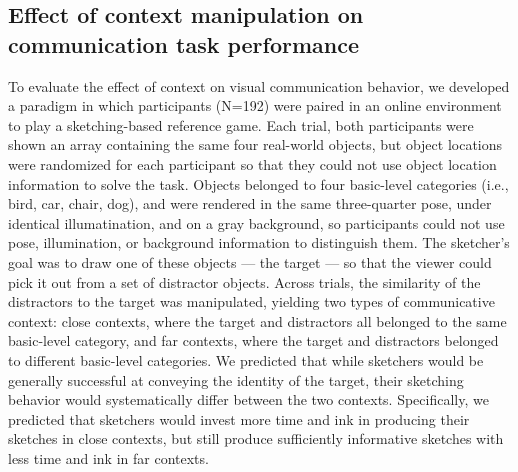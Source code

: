 \documentclass[9pt,twocolumn,twoside]{pnas-new}
\begin{document}
\subsection*{Effect of context manipulation on communication task performance}



To evaluate the effect of context on visual communication behavior, we developed a paradigm in which participants (N=192) were paired in an online environment to play a sketching-based reference game. Each trial, both participants were shown an array containing the same four real-world objects, but object locations were randomized for each participant so that they could not use object location information to solve the task. Objects belonged to four basic-level categories (i.e., bird, car, chair, dog), and were rendered in the same three-quarter pose, under identical illumatination, and on a gray background, so participants could not use pose, illumination, or background information to distinguish them. 
The sketcher's goal was to draw one of these objects --- the target --- so that the viewer could pick it out from a set of distractor objects. 
Across trials, the similarity of the distractors to the target was manipulated, yielding two types of communicative context: close contexts, where the target and distractors all belonged to the same basic-level category, and far contexts, where the target and distractors belonged to different basic-level categories. 
We predicted that while sketchers would be generally successful at conveying the identity of the target, their sketching behavior would systematically differ between the two contexts. 
Specifically, we predicted that sketchers would invest more time and ink in producing their sketches in close contexts, but still produce sufficiently informative sketches with less time and ink in far contexts. 
\end{document}
